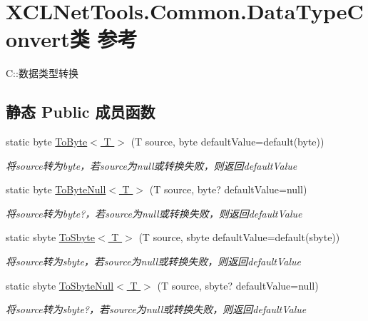 \hypertarget{class_x_c_l_net_tools_1_1_common_1_1_data_type_convert}{}\section{X\+C\+L\+Net\+Tools.\+Common.\+Data\+Type\+Convert类 参考}
\label{class_x_c_l_net_tools_1_1_common_1_1_data_type_convert}


C\+::数据类型转换  


\subsection*{静态 Public 成员函数}
\begin{DoxyCompactItemize}
\item 
static byte \hyperlink{class_x_c_l_net_tools_1_1_common_1_1_data_type_convert_a71686d4590f91717c2f2fe9393466dbc}{To\+Byte$<$ T $>$} (T source, byte default\+Value=default(byte))
\begin{DoxyCompactList}\small\item\em 将source转为byte，若source为null或转换失败，则返回default\+Value \end{DoxyCompactList}\item 
static byte \hyperlink{class_x_c_l_net_tools_1_1_common_1_1_data_type_convert_a31ffdc90ba73c781425142b98c8ea1d5}{To\+Byte\+Null$<$ T $>$} (T source, byte? default\+Value=null)
\begin{DoxyCompactList}\small\item\em 将source转为byte?，若source为null或转换失败，则返回default\+Value \end{DoxyCompactList}\item 
static sbyte \hyperlink{class_x_c_l_net_tools_1_1_common_1_1_data_type_convert_abb4e728dc94f4198376274d06f46b0cf}{To\+Sbyte$<$ T $>$} (T source, sbyte default\+Value=default(sbyte))
\begin{DoxyCompactList}\small\item\em 将source转为sbyte，若source为null或转换失败，则返回default\+Value \end{DoxyCompactList}\item 
static sbyte \hyperlink{class_x_c_l_net_tools_1_1_common_1_1_data_type_convert_ac6f44240eb78b271752d95d826eb359b}{To\+Sbyte\+Null$<$ T $>$} (T source, sbyte? default\+Value=null)
\begin{DoxyCompactList}\small\item\em 将source转为sbyte?，若source为null或转换失败，则返回default\+Value \end{DoxyCompactList}\item 

\end{DoxyCompactItemize}
